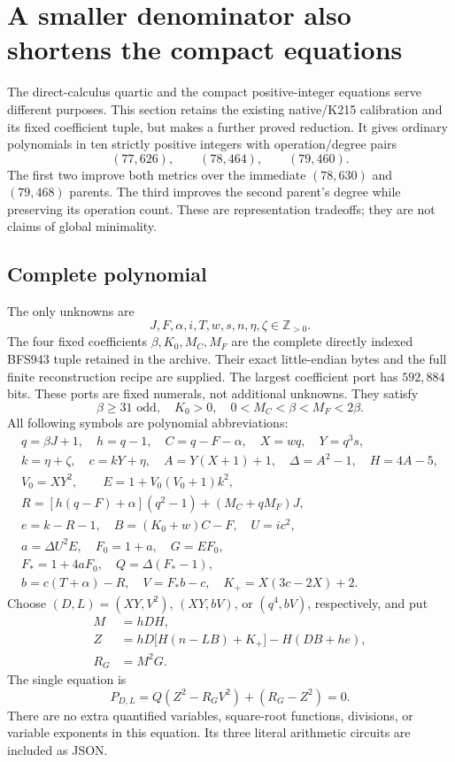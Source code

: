 \section{A smaller denominator also shortens the compact equations}
\label{sec:xy-carrier}

The direct-calculus quartic and the compact positive-integer equations serve
different purposes. This section retains the existing native/K215 calibration
and its fixed coefficient tuple, but makes a further proved reduction. It
gives ordinary polynomials in ten strictly positive integers with
operation/degree pairs
\[
 (77,626),\qquad(78,464),\qquad(79,460).
\]
The first two improve both metrics over the immediate $(78,630)$ and
$(79,468)$ parents. The third improves the second parent's degree while
preserving its operation count. These are representation tradeoffs; they
are not claims of global minimality.

\subsection{Complete polynomial}

The only unknowns are
\[
 J,F,\alpha,i,T,w,s,n,\eta,\zeta\in\mathbb Z_{>0}.
\]
The four fixed coefficients $\beta,K_0,M_C,M_F$ are the complete directly
indexed BFS943 tuple retained in the archive. Their exact little-endian
bytes and the full finite reconstruction recipe are supplied. The largest
coefficient port has $592{,}884$ bits. These ports are fixed numerals, not
additional unknowns. They satisfy
\[
 \beta\ge31\text{ odd},\quad K_0>0,\quad
 0<M_C<\beta<M_F<2\beta.
\]
All following symbols are polynomial abbreviations:
\begin{gather*}
 q=\beta J+1,\quad h=q-1,\quad C=q-F-\alpha,
 \quad X=wq,\quad Y=q^3s,\\
 k=\eta+\zeta,\quad c=kY+\eta,\quad
 A=Y(X+1)+1,\quad\Delta=A^2-1,\quad H=4A-5,\\
 V_0=XY^2,\qquad E=1+V_0(V_0+1)k^2,\\
 R=[h(q-F)+\alpha](q^2-1)+(M_C+qM_F)J,\\
 e=k-R-1,\quad B=(K_0+w)C-F,\quad U=ic^2,\\
 a=\Delta U^2E,\quad F_0=1+a,\quad G=EF_0,\\
 F_*=1+4aF_0,\quad Q=\Delta(F_*-1),\\
 b=c(T+\alpha)-R,\quad V=F_*b-c,\quad
 K_+=X(3c-2X)+2.
\end{gather*}
Choose $(D,L)=(XY,V^2)$, $(XY,bV)$, or $(q^4,bV)$, respectively,
and put
\begin{align*}
 M&=hDH,\\
 Z&=hD\bigl[H(n-LB)+K_+\bigr]-H(DB+he),\\
 R_G&=M^2G.
\end{align*}
The single equation is
\begin{equation}
 \boxed{P_{D,L}=Q(Z^2-R_GV^2)+(R_G-Z^2)=0.}
 \label{eq:xy-carrier}
\end{equation}
There are no extra quantified variables, square-root functions, divisions,
or variable exponents in this equation. Its three literal arithmetic
circuits are included as JSON.

